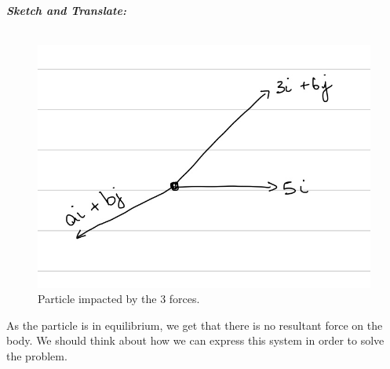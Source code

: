 \begin{subquestions}
\begin{subsubquestions}
\subsubquestion

\textbf{\textit{Sketch and Translate:}} \\ \\
\begin{figure}[H]
	\begin{center}
		\includegraphics[scale=0.25]{../2010/figures/2010q6-3}
		\caption{\label{2010:q6:Sketch3} Particle impacted by the 3 forces.}
	\end{center}
\end{figure}
As the particle is in equilibrium, we get that there is no resultant force on the body. We should think about how we can express this system in order to solve the problem.





\end{subsubquestions}
\end{subquestions}
